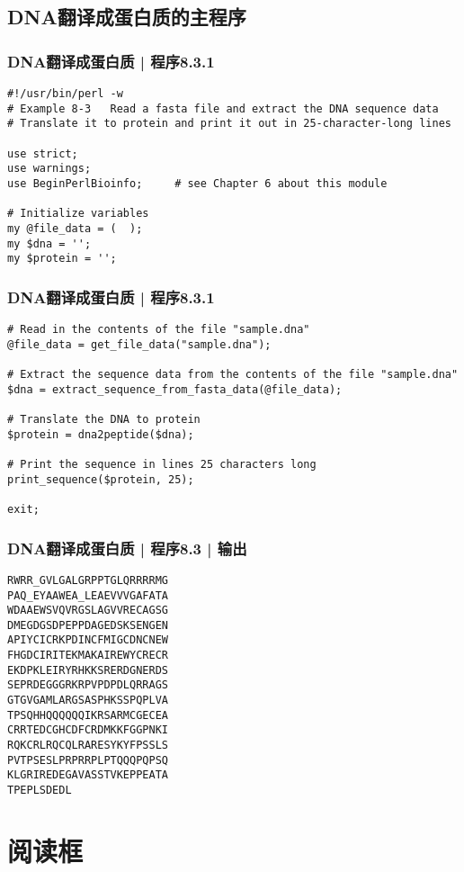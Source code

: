 \subsection{DNA翻译成蛋白质的主程序}
\begin{frame}[fragile]
  \frametitle{DNA翻译成蛋白质 | 程序8.3.1}
\begin{lstlisting}[firstnumber=1]
#!/usr/bin/perl -w
# Example 8-3   Read a fasta file and extract the DNA sequence data
# Translate it to protein and print it out in 25-character-long lines

use strict;
use warnings;
use BeginPerlBioinfo;     # see Chapter 6 about this module

# Initialize variables
my @file_data = (  );
my $dna = '';
my $protein = '';
\end{lstlisting}
\end{frame}

\begin{frame}[fragile]
  \frametitle{DNA翻译成蛋白质 | 程序8.3.1}
\begin{lstlisting}[firstnumber=13,basicstyle=\small\tt,numberstyle=\footnotesize]
# Read in the contents of the file "sample.dna"
@file_data = get_file_data("sample.dna");

# Extract the sequence data from the contents of the file "sample.dna"
$dna = extract_sequence_from_fasta_data(@file_data);

# Translate the DNA to protein
$protein = dna2peptide($dna);

# Print the sequence in lines 25 characters long
print_sequence($protein, 25);

exit;
\end{lstlisting}
\end{frame}

\begin{frame}[fragile]
  \frametitle{DNA翻译成蛋白质 | 程序8.3 | 输出}
\begin{lstlisting}[firstnumber=1]
RWRR_GVLGALGRPPTGLQRRRRMG
PAQ_EYAAWEA_LEAEVVVGAFATA
WDAAEWSVQVRGSLAGVVRECAGSG
DMEGDGSDPEPPDAGEDSKSENGEN
APIYCICRKPDINCFMIGCDNCNEW
FHGDCIRITEKMAKAIREWYCRECR
EKDPKLEIRYRHKKSRERDGNERDS
SEPRDEGGGRKRPVPDPDLQRRAGS
GTGVGAMLARGSASPHKSSPQPLVA
TPSQHHQQQQQQIKRSARMCGECEA
CRRTEDCGHCDFCRDMKKFGGPNKI
RQKCRLRQCQLRARESYKYFPSSLS
PVTPSESLPRPRRPLPTQQQPQPSQ
KLGRIREDEGAVASSTVKEPPEATA
TPEPLSDEDL
\end{lstlisting}
\end{frame}

\section{阅读框}
